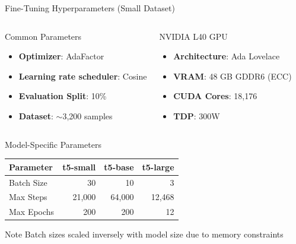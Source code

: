 \documentclass[aspectratio=169]{beamer}
\begin{document}
\begin{frame}{Fine-Tuning Hyperparameters (Small Dataset)}
\begin{columns}[t]
\begin{block}{Common Parameters}
\begin{itemize}
  \item \textbf{Optimizer}: AdaFactor
  \item \textbf{Learning rate scheduler}: Cosine
  \item \textbf{Evaluation Split}: 10\%
  \item \textbf{Dataset}: $\sim$3,200 samples
\end{itemize}
\end{block}

\begin{block}{NVIDIA L40 GPU}
\begin{itemize}
  \item \textbf{Architecture}: Ada Lovelace
  \item \textbf{VRAM}: 48 GB GDDR6 (ECC)
  \item \textbf{CUDA Cores}: 18,176
  \item \textbf{TDP}: 300W
\end{itemize}
\end{block}
\end{columns}

\begin{block}{Model-Specific Parameters}
\centering
\begin{tabular}{lrrr}
\hline
\textbf{Parameter} & \textbf{t5-small} & \textbf{t5-base} & \textbf{t5-large} \\ \hline
Batch Size & 30 & 10 & 3 \\
Max Steps & 21,000 & 64,000 & 12,468 \\
Max Epochs & 200 & 200 & 12 \\
\end{tabular}
\end{block}
\begin{alertblock}{Note}
Batch sizes scaled inversely with model size due to memory constraints
\end{alertblock}
\end{frame}
\end{document}
